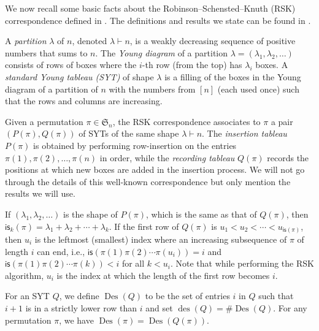 \documentclass[12pt]{article}
\newcommand{\is}{\mathsf{is}}
\newcommand{\des}{\operatorname{des}}
\newcommand{\Des}{\operatorname{Des}}
\newcommand{\s}{\mathfrak{S}}
\theoremstyle{definition}
\begin{document}
We now recall some basic facts about the Robinson--Schensted--Knuth (RSK) correspondence defined in \cite{schensted}. 
The definitions and results we state can be found in \cite{stanley_ec2}.

A \emph{partition} $\lambda$ of $n$, denoted $\lambda \vdash n$, is a weakly decreasing sequence of positive numbers that sums to $n$. 
The \emph{Young diagram} of a partition $\lambda = (\lambda_1, \lambda_2, \ldots)$ consists of rows of boxes where the $i$-th row (from the top) has $\lambda_i$ boxes. 
A \emph{standard Young tableau (SYT)} of shape $\lambda$ is a filling of the boxes in the Young diagram of a partition of $n$ with the numbers from $[n]$ (each used once) such that the rows and columns are increasing.

Given a permutation $\pi \in \s_n$, the RSK correspondence associates to $\pi$ a pair $(P(\pi), Q(\pi))$ of SYTs of the same shape $\lambda \vdash n$. 
The \emph{insertion tableau} $P(\pi)$ is obtained by performing row-insertion on the entries $\pi(1), \pi(2), \ldots, \pi(n)$ in order, while the \emph{recording tableau} $Q(\pi)$ records the positions at which new boxes are added in the insertion process. 
We will not go through the details of this well-known correspondence but only mention the results we will use.

If $(\lambda_1, \lambda_2, \ldots)$ is the shape of $P(\pi)$, which is the same as that of $Q(\pi)$, then $\is_k(\pi) = \lambda_1 + \lambda_2 + \cdots + \lambda_k$. 
If the first row of $Q(\pi)$ is $u_1 < u_2 < \cdots < u_{\is(\pi)}$, then $u_i$ is the leftmost (smallest) index where an increasing subsequence of $\pi$ of length $i$ can end, i.e., $\is(\pi(1)\pi(2) \cdots \pi(u_i)) = i$ and $\is(\pi(1)\pi(2) \cdots \pi(k)) < i$ for all $k < u_i$. 
Note that while performing the RSK algorithm, $u_i$ is the index at which the length of the first row becomes $i$.

For an SYT $Q$, we define $\Des(Q)$ to be the set of entries $i$ in $Q$ such that $i + 1$ is in a strictly lower row than $i$ and set $\des(Q) = \#\Des(Q)$. 
For any permutation $\pi$, we have $\Des(\pi) = \Des(Q(\pi))$.
\end{document}
